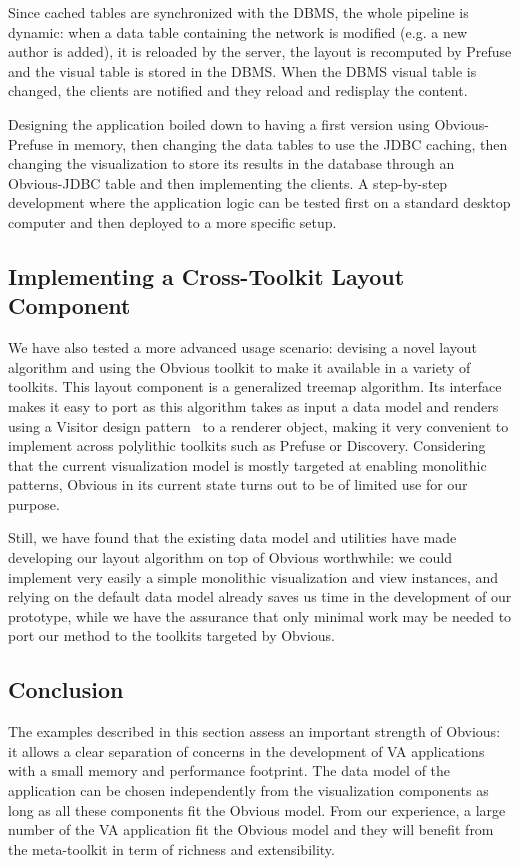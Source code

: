 Since cached tables are synchronized with the DBMS, the whole pipeline
is dynamic: when a data table containing the network is modified
(e.g. a new author is added), it is reloaded by the server, the layout
is recomputed by Prefuse and the visual table is stored in the DBMS.
When the DBMS visual table is changed, the clients are notified and
they reload and redisplay the content.

Designing the application boiled down to having a first version using
Obvious-Prefuse in memory, then changing the data tables to use the
JDBC caching, then changing the visualization to store its results in
the database through an Obvious-JDBC table and then implementing the
clients.  A step-by-step development where the application logic can
be tested first on a standard desktop computer and then deployed to a
more specific setup.

\subsection{Implementing a Cross-Toolkit Layout Component}

We have also tested a more advanced usage scenario: devising
a novel layout algorithm and using the Obvious toolkit to make it
available in a variety of toolkits. This layout component is a
generalized treemap algorithm.
Its interface makes it easy to port as this algorithm takes as input a
data model and renders using a Visitor design
pattern~\cite{DesignPatterns} to a renderer object, making it very
convenient to implement across polylithic toolkits such as Prefuse or
Discovery.  Considering that the current visualization model is mostly
targeted at enabling monolithic patterns, Obvious in its current state
turns out to be of limited use for our purpose.

Still, we have found that the existing data model and utilities have
made developing our layout algorithm on top of Obvious worthwhile: we
could implement very easily a simple monolithic visualization and
view instances, and relying on the default data model already saves us
time in the development of our prototype, while we have the assurance
that only minimal work may be needed to port our method to the
toolkits targeted by Obvious.


\subsection{Conclusion}

The examples described in this section assess an important strength of
Obvious: it allows a clear separation of concerns in the development
of VA applications with a small memory and performance footprint.  The
data model of the application can be chosen independently from the
visualization components as long as all these components fit the
Obvious model.  From our experience, a large number of the VA
application fit the Obvious model and they will benefit from the
meta-toolkit in term of richness and extensibility.

